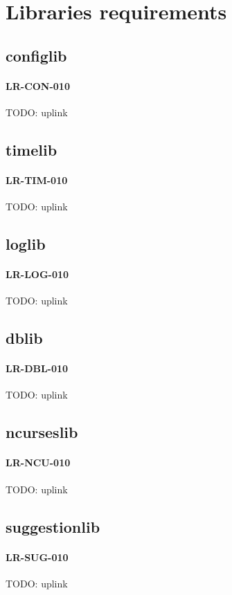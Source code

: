 \section{Libraries requirements}
\subsection{config\textunderscore lib}
\paragraph{LR-CON-010}
TODO: uplink

\subsection{time\textunderscore lib}
\paragraph{LR-TIM-010}
TODO: uplink

\subsection{log\textunderscore lib}
\paragraph{LR-LOG-010}
TODO: uplink

\subsection{db\textunderscore lib}
\paragraph{LR-DBL-010}
TODO: uplink

\subsection{ncurses\textunderscore lib}
\paragraph{LR-NCU-010}
TODO: uplink

\subsection{suggestion\textunderscore lib}
\paragraph{LR-SUG-010}
TODO: uplink
